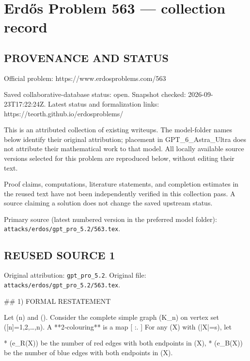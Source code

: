\section*{Erd\H{o}s Problem 563 --- collection record}

\subsection*{PROVENANCE AND STATUS}
Official problem: https://www.erdosproblems.com/563

Saved collaborative-database status: open.
Snapshot checked: 2026-09-23T17:22:24Z.
Latest status and formalization links: https://teorth.github.io/erdosproblems/

This is an attributed collection of existing writeups. The model-folder names below identify their original attribution; placement in GPT\_6\_Astra\_Ultra does not attribute their mathematical work to that model. All locally available source versions selected for this problem are reproduced below, without editing their text.

Proof claims, computations, literature statements, and completion estimates in the reused text have not been independently verified in this collection pass. A source claiming a solution does not change the saved upstream status.

Primary source (latest numbered version in the preferred model folder): \texttt{attacks/erdos/gpt\_pro\_5.2/563.tex}.

\subsection*{REUSED SOURCE 1}
Original attribution: \texttt{gpt\_pro\_5.2}.
Original file: \texttt{attacks/erdos/gpt\_pro\_5.2/563.tex}.

## 1) FORMAL RESTATEMENT

Let (n\in{}) and (\alpha\in[0,1/2]). Consider the complete simple graph (K_n) on vertex set ([n]={1,2,\dots,n}). A **2‑colouring** is a map
[
\chi:.
]
For any (X\subseteq[n]) with (|X|=s), let

* (e_R(X)) be the number of red edges with both endpoints in (X),
* (e_B(X)) be the number of blue edges with both endpoints in (X).

